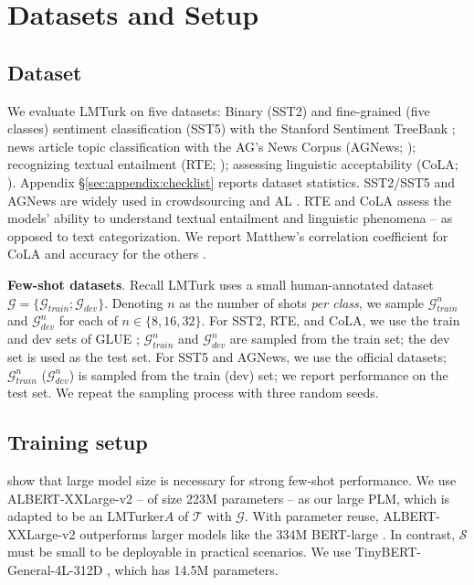 \documentclass[11pt]{article}
\def\md{LMTurk\xspace}
\def\mdr{LMTurker\xspace}
\def\secref#1{\S\ref{sec:#1}}
\def\seclabel#1{\label{sec:#1}}
\begin{document}
\section{Datasets and Setup}
\subsection{Dataset}
We evaluate \md on five datasets:
Binary (SST2) and
fine-grained (five classes)
sentiment classification (SST5)
with the Stanford Sentiment TreeBank
\citep{socher-etal-2013-recursive};
news article topic classification with the
AG's News Corpus (AGNews; \citet{agdataset});
recognizing textual entailment (RTE; \citet{rtedata});
assessing linguistic acceptability
(CoLA; \citet{warstadt-etal-2019-neural}).
Appendix \secref{appendix:checklist} reports
dataset statistics.
SST2/SST5 and AGNews are widely used
in crowdsourcing and AL \citep{
  laws-etal-2011-activeb,
  ein-dor-etal-2020-active,
  margatina2021active,
  zhang-plank-2021-cartography-active}.
RTE and CoLA
assess
the models' ability to understand
textual entailment
and linguistic phenomena -- as opposed to
text categorization.
We report Matthew’s correlation coefficient
for CoLA and accuracy for the others \citep{wang-etal-2018-glue}.


\textbf{Few-shot datasets}.
Recall \md uses a small
human-annotated dataset
$\mathcal{G} = \{\mathcal{G}_{train}; \mathcal{G}_{dev}\}$.
Denoting $n$ as the number of shots \emph{per class},
we sample $\mathcal{G}^n_{train}$ and $\mathcal{G}^n_{dev}$
for each of $n \in \{8, 16, 32\}$.
For SST2, RTE, and CoLA, we use the train and dev
sets of  GLUE \citep{wang-etal-2018-glue};
$\mathcal{G}^n_{train}$ and $\mathcal{G}^n_{dev}$ are
sampled from the train set;
the dev set is used as the test set.
For SST5 and AGNews, we use
the official datasets;
$\mathcal{G}^n_{train}$ 
($\mathcal{G}^n_{dev}$) is sampled from the
train (dev) set;
we report  performance on the test set.
We repeat the sampling process
with three random seeds.




\subsection{Training setup}
\seclabel{promptingdetails}
\citet{GPT3paper} show that
large model size is necessary
for strong few-shot performance.
We use ALBERT-XXLarge-v2
\citep{albert} -- of size 223M parameters --
as our large PLM, which is
adapted to be an \mdr $A$ of
$\mathcal{T}$ with $\mathcal{G}$.
With parameter reuse, ALBERT-XXLarge-v2 
outperforms
larger models
like the 334M
BERT-large \citep{devlin-etal-2019-bert}.
In contrast,
$\mathcal{S}$
must be small
to be deployable
in practical scenarios.
We use TinyBERT-General-4L-312D
\citep{jiao-etal-2020-tinybert},
which has 14.5M parameters.
\end{document}
